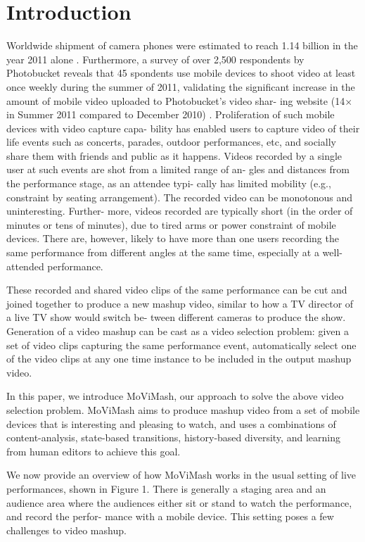 \documentclass{sig-alternate}
\begin{document}
\section{Introduction}
Worldwide shipment of camera phones were estimated to reach
1.14 billion in the year 2011 alone \cite{saini2012movimash}. Furthermore, a survey of
over 2,500 respondents by Photobucket reveals that 45%
spondents use mobile devices to shoot video at least once weekly during the summer of 2011, validating the significant increase in
the amount of mobile video uploaded to Photobucket’s video shar-
ing website (14× in Summer 2011 compared to December 2010) \cite{saini2012movimash}.
Proliferation of such mobile devices with video capture capa-
bility has enabled users to capture video of their life events such
as concerts, parades, outdoor performances, etc, and socially share
them with friends and public as it happens. Videos recorded by
a single user at such events are shot from a limited range of an-
gles and distances from the performance stage, as an attendee typi-
cally has limited mobility (e.g., constraint by seating arrangement).
The recorded video can be monotonous and uninteresting. Further-
more, videos recorded are typically short (in the order of minutes
or tens of minutes), due to tired arms or power constraint of mobile
devices. There are, however, likely to have more than one users
recording the same performance from different angles at the same
time, especially at a well-attended performance.

These recorded and shared video clips of the same performance
can be cut and joined together to produce a new mashup video,
similar to how a TV director of a live TV show would switch be-
tween different cameras to produce the show. Generation of a video
mashup can be cast as a video selection problem: given a set of
video clips capturing the same performance event, automatically
select one of the video clips at any one time instance to be included
in the output mashup video.

In this paper, we introduce MoViMash, our approach to solve
the above video selection problem. MoViMash aims to produce
mashup video from a set of mobile devices that is interesting and
pleasing to watch, and uses a combinations of content-analysis,
state-based transitions, history-based diversity, and learning from
human editors to achieve this goal.

We now provide an overview of how MoViMash works in the
usual setting of live performances, shown in Figure 1. There is
generally a staging area and an audience area where the audiences
either sit or stand to watch the performance, and record the perfor-
mance with a mobile device. This setting poses a few challenges to
video mashup.
\end{document}
